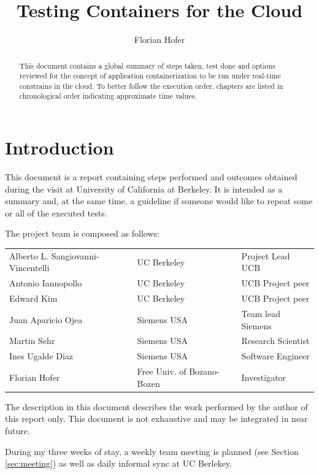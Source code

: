 \documentclass[]{scrartcl}
\title{Testing Containers for the Cloud}
\author{Florian Hofer}
\date{}
\begin{document}
\maketitle

\begin{abstract}
	This document contains a global summary of steps taken, test done and options reviewed for the concept of application containerization to be run under real-time constrains in the cloud. To better follow the execution order, chapters are listed in chronological order indicating approximate time values.
\end{abstract}

\section{Introduction}

This document is a report containing steps performed and outcomes obtained during the visit at University of California at Berkeley. It is intended as a summary and, at the same time, a guideline if someone would like to repeat some or all of the executed tests.

The project team is composed as follows:

\begin{table}[H]
	\begin{tabular}{l l l}
		Alberto L. Sangiovanni-Vincentelli & UC Berkeley & Project Lead UCB \\
		Antonio Iannopollo & UC Berkeley & UCB Project peer \\
		Edward Kim & UC Berkeley & UCB Project peer \\
		Juan Aparicio Ojea & Siemens USA & Team lead Siemens\\
		Martin Sehr & Siemens USA & Research Scientist\\
		Ines Ugalde Diaz & Siemens USA & Software Engineer \\
		Florian Hofer & Free Univ. of Bozano-Bozen & Investigator \\		
	\end{tabular}
\end{table}

The description in this document describes the work performed by the author of this report only. This document is not exhaustive and may be integrated in near future.

During my three weeks of stay, a weekly team meeting is planned (see Section \ref{sec:meeting}) as well as daily informal sync at UC Berlekey.
\end{document}
